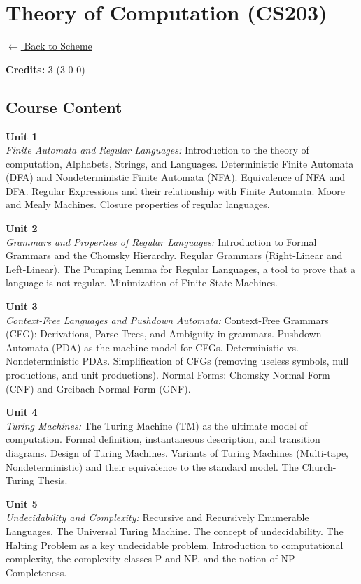 \section*{Theory of Computation (CS203)}
\label{course:CS203}

\noindent \small{\hyperref[main:scheme]{$\leftarrow$ Back to Scheme}} \vspace{0.5cm}

\noindent \textbf{Credits:} 3 (3-0-0)

\subsection*{Course Content}
\noindent\textbf{Unit 1} \\
\textit{Finite Automata and Regular Languages:} Introduction to the theory of computation, Alphabets, Strings, and Languages. Deterministic Finite Automata (DFA) and Nondeterministic Finite Automata (NFA). Equivalence of NFA and DFA. Regular Expressions and their relationship with Finite Automata. Moore and Mealy Machines. Closure properties of regular languages.

\vspace{0.3cm}

\noindent\textbf{Unit 2} \\
\textit{Grammars and Properties of Regular Languages:} Introduction to Formal Grammars and the Chomsky Hierarchy. Regular Grammars (Right-Linear and Left-Linear). The Pumping Lemma for Regular Languages, a tool to prove that a language is not regular. Minimization of Finite State Machines.

\vspace{0.3cm}

\noindent\textbf{Unit 3} \\
\textit{Context-Free Languages and Pushdown Automata:} Context-Free Grammars (CFG): Derivations, Parse Trees, and Ambiguity in grammars. Pushdown Automata (PDA) as the machine model for CFGs. Deterministic vs. Nondeterministic PDAs. Simplification of CFGs (removing useless symbols, null productions, and unit productions). Normal Forms: Chomsky Normal Form (CNF) and Greibach Normal Form (GNF).

\vspace{0.3cm}

\noindent\textbf{Unit 4} \\
\textit{Turing Machines:} The Turing Machine (TM) as the ultimate model of computation. Formal definition, instantaneous description, and transition diagrams. Design of Turing Machines. Variants of Turing Machines (Multi-tape, Nondeterministic) and their equivalence to the standard model. The Church-Turing Thesis.

\vspace{0.3cm}

\noindent\textbf{Unit 5} \\
\textit{Undecidability and Complexity:} Recursive and Recursively Enumerable Languages. The Universal Turing Machine. The concept of undecidability. The Halting Problem as a key undecidable problem. Introduction to computational complexity, the complexity classes P and NP, and the notion of NP-Completeness.

\newpage
{}